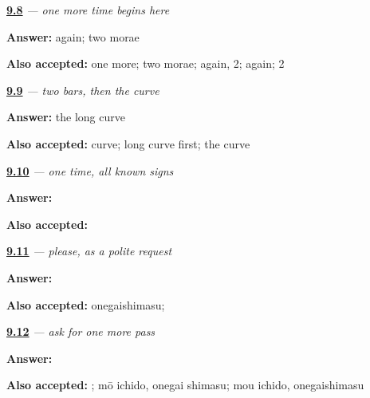 \noindent\begin{minipage}[t]{\linewidth}
\raggedright
\hyperlink{review-JA-C09-mou-beats}{\textbf{9.8}} \emph{ — one more time begins here}\par
\small \textbf{Answer:} again; two morae\par
\footnotesize \textbf{Also accepted:} one more; two morae; again, 2; again; 2
\end{minipage}\par\medskip

\noindent\begin{minipage}[t]{\linewidth}
\raggedright
\hyperlink{review-JA-W09-mo-order}{\textbf{9.9}} \emph{ — two bars, then the curve}\par
\small \textbf{Answer:} the long curve\par
\footnotesize \textbf{Also accepted:} curve; long curve first; the curve
\end{minipage}\par\medskip

\noindent\begin{minipage}[t]{\linewidth}
\raggedright
\hyperlink{review-JA-C09-ichido-dictation}{\textbf{9.10}} \emph{ — one time, all known signs}\par
\small \textbf{Answer:} \par
\footnotesize \textbf{Also accepted:} 
\end{minipage}\par\medskip

\noindent\begin{minipage}[t]{\linewidth}
\raggedright
\hyperlink{review-JA-C09-onegaishimasu-job}{\textbf{9.11}} \emph{ — please, as a polite request}\par
\small \textbf{Answer:} \par
\footnotesize \textbf{Also accepted:} onegaishimasu; 
\end{minipage}\par\medskip

\noindent\begin{minipage}[t]{\linewidth}
\raggedright
\hyperlink{review-JA-C09-mou-ichido-onegaishimasu-request}{\textbf{9.12}} \emph{ — ask for one more pass}\par
\small \textbf{Answer:} \par
\footnotesize \textbf{Also accepted:} ; mō ichido, onegai shimasu; mou ichido, onegaishimasu
\end{minipage}\par\medskip

